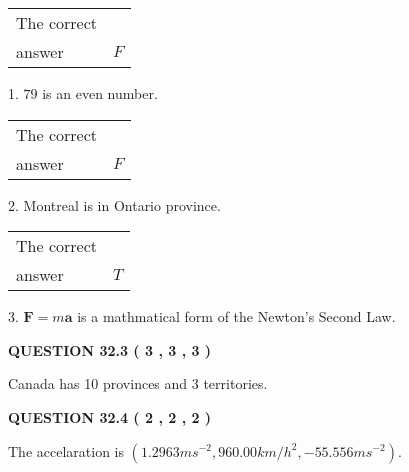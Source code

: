 \documentclass[12pt]{article}
\begin{document}
 
\noindent{}

 
\noindent\begin{tabular}{|l|l|}\hline The correct & \\
          answer &  %
$F$ \\ \hline \end{tabular}
1. $ %
79$ is an  %
even number.
 
\noindent\begin{tabular}{|l|l|}\hline The correct & \\
          answer &  %
$F$ \\ \hline \end{tabular}
2.  %
Montreal is in  %
Ontario province.
 
\noindent\begin{tabular}{|l|l|}\hline The correct & \\
          answer &  %
$T$ \\ \hline \end{tabular}
3.  %
$\mathbf{F}=m\mathbf{a}$ is a mathmatical form of  %
the Newton's Second Law.
 
 
 
  
\vspace{0.2in}
  
{\textbf{\Large{QUESTION
32.3 
 (           3 ,           3 ,           3 )
}}}
  
  
 
 
\noindent{}
 
 
Canada has  %
10 provinces and  %
3 territories.
 
 
 
 
  
\vspace{0.2in}
  
{\textbf{\Large{QUESTION
32.4 
 (           2 ,           2 ,           2 )
}}}
  
  
 
 
\noindent{}
 
 
The accelaration is
$(
1.2963ms^{-2},
960.00km/h^2,
-55.556ms^{-2}
).
$
 
 
 
 
 
 
\noindent{}
\end{document}
